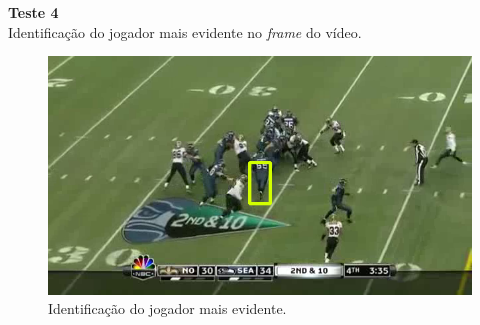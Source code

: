 \textbf{Teste 4}\\
Identificação do jogador mais evidente no \textit{frame} do vídeo.

\begin{figure}
    \centering
    \caption{Identificação do jogador mais evidente.}
    \includegraphics[scale=0.5]{05-SLIDES_DESENVOLVIMENTO/Etapa_de_Testes/imagens_testes/jogador_mais_evidente.png}
\end{figure}